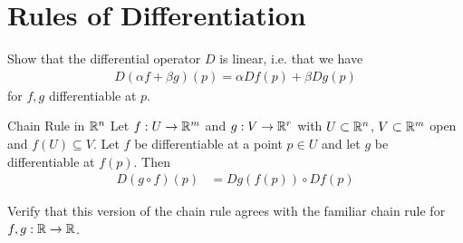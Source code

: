 \section{Rules of Differentiation}
\begin{exercise}
	Show that the differential operator $D$ is linear, i.e. that we have
	\begin{align*}
		D(\alpha f + \beta g)(p) = \alpha Df(p) + \beta Dg(p)
	\end{align*}
	for $f, g$ differentiable at $p$.
\end{exercise}
\begin{importanttheorem}{Chain Rule in $\mathbb{R}^n$}{}
	Let $f : U \to \mathbb{R}^m$ and $g : V \to \mathbb{R}^r$ with $U \subset \mathbb{R}^n$, $V \subset \mathbb{R}^m$ open and $f(U) \subseteq V$. Let $f$ be differentiable at a point $p \in U$ and let $g$ be differentiable at $f(p)$. Then
	\begin{align*}
		D(g \circ f)(p)
		&=
		Dg(f(p)) \circ Df(p)
	\end{align*}
\end{importanttheorem}
\begin{exercise}
	Verify that this version of the chain rule agrees with the familiar chain rule for $f,g : \mathbb{R} \to \mathbb{R}$.
\end{exercise}
